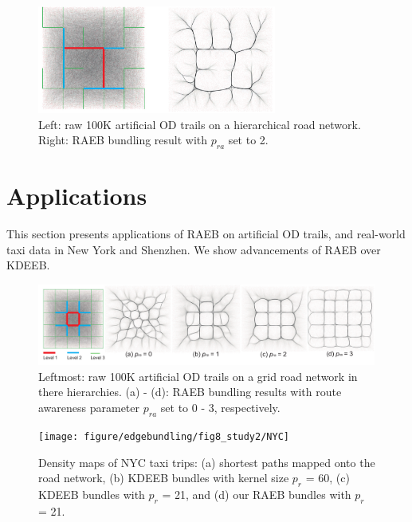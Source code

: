 \begin{figure}[t]
	\centering
	\includegraphics[width=0.7\textwidth]{figure/edgebundling/fig7_hierar/artifical}
	\vspace{-6mm}
	\caption{
		Left: raw 100K artificial OD trails on a hierarchical road network.
		Right: RAEB bundling result with $p_{ra}$ set to 2.
		}
	\label{fig:hier}
	\vspace{-1mm}
\end{figure}

\section{Applications}
This section presents applications of RAEB on artificial OD trails, and real-world taxi data in New York and Shenzhen.
We show advancements of RAEB over KDEEB.
\begin{figure}[t]
	\centering
	\includegraphics[width=0.995\textwidth]{figure/edgebundling/fig6_grid/route}
	\vspace{-4mm}
	\caption{
		Leftmost: raw 100K artificial OD trails on a grid road network in there hierarchies. 
		(a) - (d): RAEB bundling results with route awareness parameter $p_{ra}$ set to 0 - 3, respectively.
	}
	\label{fig:grid}
	\vspace{-4mm}
\end{figure}
\begin{figure}[t]
	\centering
	\texttt{[image: figure/edgebundling/fig8\_study2/NYC]}
	\vspace{0mm}
	\caption{Density maps of NYC taxi trips:
	(a) shortest paths mapped onto the road network, 
	(b) KDEEB bundles with kernel size $p_r$ = 60,
	(c) KDEEB bundles with $p_r$ = 21,
	and (d) our RAEB bundles with $p_r$ = 21.}
	\label{fig:nyc_visual}
	\vspace{0mm}
\end{figure}

